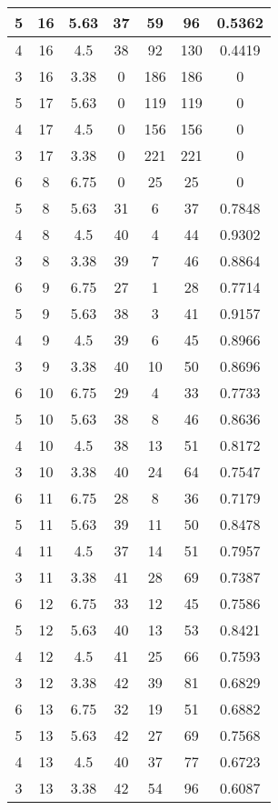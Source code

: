 \documentclass[letterpaper, 12pt]{article}
\begin{document}
\begin{longtable}{|c|c|c|c|c|c|c|}
\hline
5 & 16 & 5.63 & 37 & 59 & 96 & 0.5362 \\
\hline
4 & 16 & 4.5 & 38 & 92 & 130 & 0.4419 \\
\hline
3 & 16 & 3.38 & 0 & 186 & 186 & 0 \\
\hline
5 & 17 & 5.63 & 0 & 119 & 119 & 0 \\
\hline
4 & 17 & 4.5 & 0 & 156 & 156 & 0 \\
\hline
3 & 17 & 3.38 & 0 & 221 & 221 & 0 \\
\hline
6 & 8 & 6.75 & 0 & 25 & 25 & 0 \\
\hline
5 & 8 & 5.63 & 31 & 6 & 37 & 0.7848 \\
\hline
4 & 8 & 4.5 & 40 & 4 & 44 & 0.9302 \\
\hline
3 & 8 & 3.38 & 39 & 7 & 46 & 0.8864 \\
\hline
6 & 9 & 6.75 & 27 & 1 & 28 & 0.7714 \\
\hline
5 & 9 & 5.63 & 38 & 3 & 41 & 0.9157 \\
\hline
4 & 9 & 4.5 & 39 & 6 & 45 & 0.8966 \\
\hline
3 & 9 & 3.38 & 40 & 10 & 50 & 0.8696 \\
\hline
6 & 10 & 6.75 & 29 & 4 & 33 & 0.7733 \\
\hline
5 & 10 & 5.63 & 38 & 8 & 46 & 0.8636 \\
\hline
4 & 10 & 4.5 & 38 & 13 & 51 & 0.8172 \\
\hline
3 & 10 & 3.38 & 40 & 24 & 64 & 0.7547 \\
\hline
6 & 11 & 6.75 & 28 & 8 & 36 & 0.7179 \\
\hline
5 & 11 & 5.63 & 39 & 11 & 50 & 0.8478 \\
\hline
4 & 11 & 4.5 & 37 & 14 & 51 & 0.7957 \\
\hline
3 & 11 & 3.38 & 41 & 28 & 69 & 0.7387 \\
\hline
6 & 12 & 6.75 & 33 & 12 & 45 & 0.7586 \\
\hline
5 & 12 & 5.63 & 40 & 13 & 53 & 0.8421 \\
\hline
4 & 12 & 4.5 & 41 & 25 & 66 & 0.7593 \\
\hline
3 & 12 & 3.38 & 42 & 39 & 81 & 0.6829 \\
\hline
6 & 13 & 6.75 & 32 & 19 & 51 & 0.6882 \\
\hline
5 & 13 & 5.63 & 42 & 27 & 69 & 0.7568 \\
\hline
4 & 13 & 4.5 & 40 & 37 & 77 & 0.6723 \\
\hline
3 & 13 & 3.38 & 42 & 54 & 96 & 0.6087 \\
\hline

\end{longtable}
\end{document}
